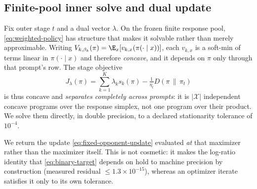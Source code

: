 %
%

\subsection{Finite-pool inner solve and dual update}
\label{sec:finite-pool-inner}
Fix outer stage $t$ and a dual vector $\lambda$. On the frozen finite response
pool, \eqref{eq:weighted-policy} has structure that makes it solvable rather
than merely approximable. Writing $V_{k,\beta_k}(\pi)=\E_x[v_{k,x}(\pi(\cdot\mid x))]$,
each $v_{k,x}$ is a soft-min of terms linear in $\pi(\cdot\mid x)$ and therefore
\emph{concave}, and it depends on $\pi$ only through that prompt's row. The
stage objective
\[
J_\lambda(\pi)
=
\sum_{k=1}^K \lambda_k s_k(\pi)-\tfrac{1}{\eta_t}D(\pi\,\|\,\pi_t)
\]
is thus concave and \emph{separates completely across prompts}: it is $|\mathcal{X}|$
independent concave programs over the response simplex, not one program over
their product. We solve them directly, in double precision, to a declared
stationarity tolerance of $10^{-4}$.

We return the update \eqref{eq:fixed-opponent-update} evaluated \emph{at} that
maximizer rather than the maximizer itself. This is not cosmetic: it makes the
log-ratio identity that \eqref{eq:binary-target} depends on hold to machine
precision by construction (measured residual $\le 1.3\times10^{-15}$), whereas an
optimizer iterate satisfies it only to its own tolerance.

